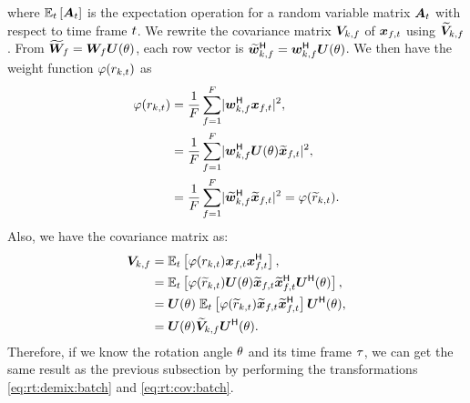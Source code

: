 \documentclass[sip,biber]{now-journal}
\begin{document}
where $\mathbb{E} _{t}\left[\bm{A} _{t}\right]$ is the expectation operation for a random variable matrix $\bm{A}_{t}$ with respect to time frame $t$.
We rewrite the covariance matrix ${\bm{V}} _{k,f}$ of $\Obs _{\ft}$ using $\widetilde{\bm{V}} _{k,f}$.
From $\widetilde{\bm{W}} _{f} = \bm{W} _{f} \bm{U} (\theta)$, each row vector is $\widetilde{\bm{w}} _{k,f} ^{\mathsf{H}} = \bm{w} _{k,f} ^{\mathsf{H}} \bm{U} (\theta)$.
We then have the weight function $\varphi(r _{k,t})$ as
\begin{align}
  \weight (\var _{\src,\tframe}) &= \frac{1}{\Freq} \sum _{\freq = 1} ^{\Freq} \lvert \demix _{\src,\freq} ^{\hermite} \Obs _{\ft} \rvert ^2, \\
                                 &= \frac{1}{\Freq} \sum _{\freq = 1} ^{\Freq} \lvert \demix _{\src,\freq} ^{\hermite} \rotMat (\rotSpat) \refpos{\Obs} _{\ft} \rvert ^2, \\
                                 &= \frac{1}{\Freq} \sum _{\freq = 1} ^{\Freq} \lvert \refpos{\demix} _{\src,\freq} ^{\hermite} \refpos{\Obs} _{\ft} \rvert ^2 = \weight (\refpos{\var} _{\src,\tframe}).
\end{align}
Also, we have the covariance matrix as:
\begin{align}
  \cov _{\src,\freq} &= \expct  _{\tframe} \left[\weight (\var _{\src,\tframe}) \Obs _{\ft} \Obs _{\ft} ^{\hermite}\right], \\
                     &= \expct  _{\tframe} \left[\weight (\refpos{\var} _{\src,\tframe}) \rotMat (\rotSpat) \refpos{\Obs} _{\ft} \refpos{\Obs} _{\ft} ^{\hermite} \rotMat ^{\hermite} (\rotSpat)\right], \\
                     &= \rotMat (\rotSpat)\; \expct  _{\tframe} \left[\weight (\refpos{\var} _{\src,\tframe}) \refpos{\Obs} _{\ft} \refpos{\Obs} _{\ft} ^{\hermite} \right] \rotMat ^{\hermite} (\rotSpat), \\
                     &= \rotMat (\rotSpat) \refpos{\cov} _{\src,\freq} \rotMat ^{\hermite} (\rotSpat). \label{eq:rt:cov:batch}
\end{align}
Therefore, if we know the rotation angle $\theta$ and its time frame $\tau$, we can get the same result as the previous subsection by performing the transformations \eqref{eq:rt:demix:batch} and \eqref{eq:rt:cov:batch}.
\end{document}
